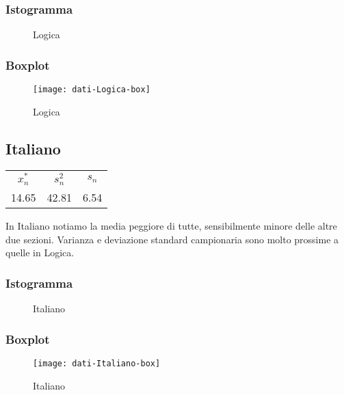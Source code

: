 \subsubsection{Istogramma}
\begin{figure}[!h]
  \caption{Logica}
\end{figure}

\subsubsection{Boxplot}
\begin{figure}[!h]
  \centering
  \texttt{[image: dati-Logica-box]}
  \caption{Logica}
\end{figure}
\restoregeometry
\clearpage

\thispagestyle{empty} %
\subsection{Italiano}

\begin{center}
\begin{tabular}{ccc}
  \toprule
  \(x_{n}^{*}\) & \(s_n^2\) & \(s_n\) \\
  14.65 & 42.81 & 6.54 \\
  \bottomrule
\end{tabular}
\end{center}
In Italiano notiamo la media peggiore di tutte, sensibilmente minore delle altre due sezioni. Varianza e deviazione standard campionaria sono molto prossime a quelle in Logica.
\subsubsection{Istogramma}
\begin{figure}[!h]
  \caption{Italiano}
\end{figure}

\subsubsection{Boxplot}
\begin{figure}[!h]
  \centering
  \texttt{[image: dati-Italiano-box]}
  \caption{Italiano}
\end{figure}
\restoregeometry
\clearpage

